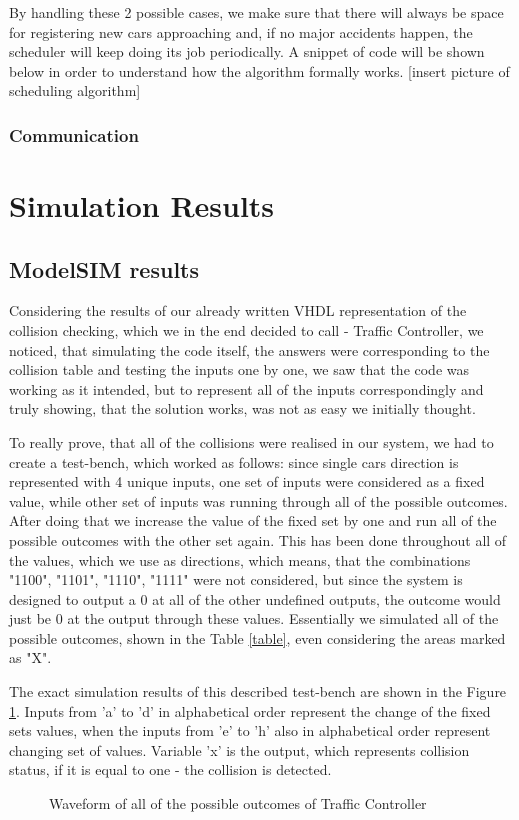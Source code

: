 \documentclass[conference]{IEEEtran}
\begin{document}
By handling these 2 possible cases, we make sure that there will always be space for registering new cars approaching and, if no major accidents happen, the scheduler will keep doing its job periodically.
A snippet of code will be shown below in order to understand how the algorithm formally works.
[insert picture of scheduling algorithm]

\subsubsection{Communication}



\section{Simulation Results}

\subsection{ModelSIM results}

Considering the results of our already written VHDL representation of the collision checking, which we in the end decided to call - Traffic Controller, we noticed, that simulating the code itself, the answers were corresponding to the collision table and testing the inputs one by one, we saw that the code was working as it intended, but to represent all of the inputs correspondingly and truly showing, that the solution works, was not as easy we initially thought.

To really prove, that all of the collisions were realised in our system, we had to create a test-bench, which worked as follows: since single cars direction is represented with 4 unique inputs, one set of inputs were considered as a fixed value, while other set of inputs was running through all of the possible outcomes. After doing that we increase the value of the fixed set by one and run all of the possible outcomes with the other set again. This has been done throughout all of the values, which we use as directions, which means, that the combinations "1100", "1101", "1110", "1111" were not considered, but since the system is designed to output a 0 at all of the other undefined outputs, the outcome would just be 0 at the output through these values. Essentially we simulated all of the possible outcomes, shown in the Table \ref{table}, even considering the areas marked as "X".

The exact simulation results of this described test-bench are shown in the Figure \ref{testbench}. Inputs from 'a' to 'd' in alphabetical order represent the change of the fixed sets values, when the inputs from 'e' to 'h' also in alphabetical order represent changing set of values. Variable 'x' is the output, which represents collision status, if it is equal to one - the collision is detected.
\begin{figure}[ht]
    \caption{Waveform of all of the possible outcomes of Traffic Controller}
    \label{testbench}
\end{figure}
\end{document}
